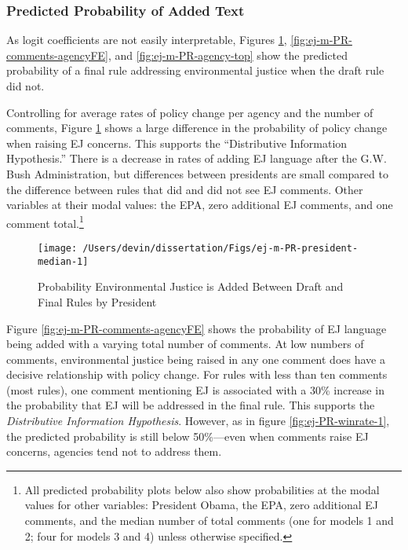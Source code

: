 \documentclass[
      12pt,
        ]{article}
\begin{document}
\hypertarget{predicted-probability-of-added-text}{%
\subsubsection{Predicted Probability of Added Text}\label{predicted-probability-of-added-text}}

As logit coefficients are not easily interpretable, Figures \ref{fig:ej-m-PR-president-median-1}, \ref{fig:ej-m-PR-comments-agencyFE}, and \ref{fig:ej-m-PR-agency-top} show the predicted probability of a final rule addressing environmental justice when the draft rule did not.

Controlling for average rates of policy change per agency and the number of comments, Figure \ref{fig:ej-m-PR-president-median-1} shows a large difference in the probability of policy change when raising EJ concerns. This supports the ``Distributive Information Hypothesis.'' There is a decrease in rates of adding EJ language after the G.W. Bush Administration, but differences between presidents are small compared to the difference between rules that did and did not see EJ comments. Other variables at their modal values: the EPA, zero additional EJ comments, and one comment total.\footnote{All predicted probability plots below also show probabilities at the modal values for other variables: President Obama, the EPA, zero additional EJ comments, and the median number of total comments (one for models 1 and 2; four for models 3 and 4) unless otherwise specified.}

\begin{figure}

{\centering \texttt{[image: /Users/devin/dissertation/Figs/ej-m-PR-president-median-1]} 

}

\caption{Probability Environmental Justice is Added Between Draft and Final Rules by President}\label{fig:ej-m-PR-president-median-1}
\end{figure}

Figure \ref{fig:ej-m-PR-comments-agencyFE} shows the probability of EJ language being added with a varying total number of comments.
At low numbers of comments, environmental justice being raised in any one comment does have a decisive relationship with policy change. For rules with less than ten comments (most rules), one comment mentioning EJ is associated with a 30\% increase in the probability that EJ will be addressed in the final rule. This supports the \emph{Distributive Information Hypothesis}. However, as in figure \ref{fig:ej-PR-winrate-1}, the predicted probability is still below 50\%---even when comments raise EJ concerns, agencies tend not to address them.
\end{document}
